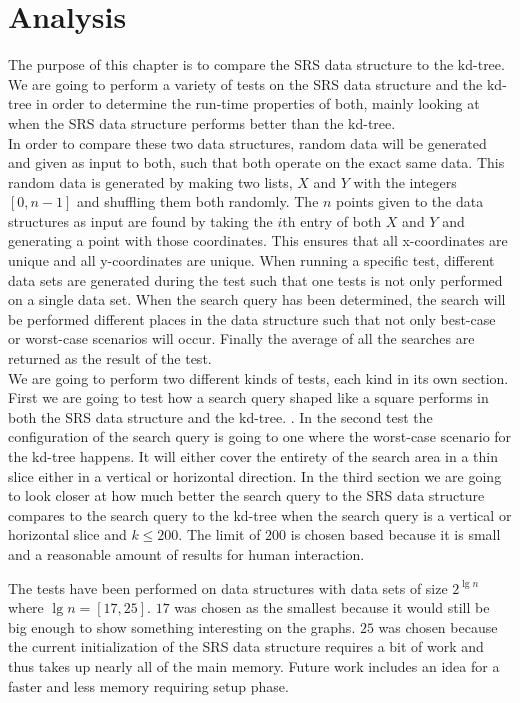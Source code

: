 \chapter{Analysis}
The purpose of this chapter is to compare the SRS data structure to the kd-tree. We are going to perform a variety of tests on the SRS data structure and the kd-tree in order to determine the run-time properties of both, mainly looking at when the SRS data structure performs better than the kd-tree.\\


In order to compare these two data structures, random data will be generated and given as input to both, such that both operate on the exact same data. This random data is generated by making two lists, $X$ and $Y$ with the integers $[0,n-1]$ and shuffling them both randomly. The $n$ points given to the data structures as input are found by taking the $i$th entry of both $X$ and $Y$ and generating a point with those coordinates. This ensures that all x-coordinates are unique and all y-coordinates are unique.  When running a specific test, different data sets are generated during the test such that one tests is not only performed on a single data set. When the search query has been determined, the search will be performed different places in the data structure such that not only best-case or worst-case scenarios will occur. Finally the average of all the searches are returned as the result of the test.\\

We are going to perform two different kinds of tests, each kind in its own section. First we are going to test how a search query shaped like a square performs in both the SRS data structure and the kd-tree. . In the second test the configuration of the search query is going to one where the worst-case scenario for the kd-tree happens. It will either cover the entirety of the search area in a thin slice either in a vertical or horizontal direction. In the third section we are going to look closer at how much better the search query to the SRS data structure compares to the search query to the kd-tree when the search query is a vertical or horizontal slice and $k \leq 200$. The limit of $200$ is chosen based because it is small and a reasonable amount of results for human interaction.

The tests have been performed on data structures with data sets of size $2^{\lg n}$ where $\lg n = [17,25]$. $17$ was chosen as the smallest because it would still be big enough to show something interesting on the graphs. $25$ was chosen because the current initialization of the SRS data structure requires a bit of work and thus takes up nearly all of the main memory. Future work includes an idea for a faster and less memory requiring setup phase.

